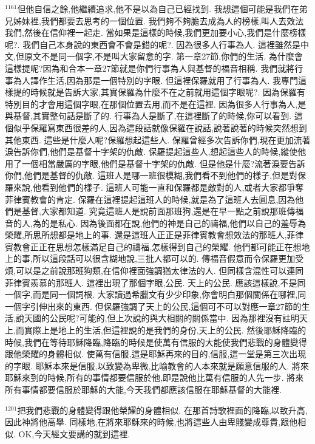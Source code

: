 \documentclass{book}
\begin{document}
$^{1161}$但他自信之餘,他繼續追求,他不是以為自己已經找到.
我想這個可能是我們在弟兄姊妹裡,我們都要去思考的一個位置.
我們夠不夠膽去成為人的榜樣,叫人去效法我們,然後在信仰裡一起走.
當如果是這樣的時候,我們更加要小心,我們是什麼榜樣呢?.
我們自己本身說的東西會不會是錯的呢?.
因為很多人行事為人.
這裡雖然是中文,但原文不是同一個字,不是叫大家留意的字.
第一章27節,你們的生活.
為什麼會這樣提呢?因為和合本一章27節就是你們行事為人與基督的福音相稱.
我們就將行事為人譯作生活,因為那是一個特別的字眼.
但這裡保羅就用了行事為人.
我專門這樣提的時候就是告訴大家,其實保羅為什麼不在之前就用這個字眼呢?.
因為保羅有特別目的才會用這個字眼,在那個位置去用,而不是在這裡.
因為很多人行事為人,是與基督,其實整句話是斷了的.
行事為人是斷了,在這裡斷了的時候,你可以看到.
這個似乎保羅寫東西很差的人,因為這段話就像保羅在說話,說著說著的時候突然想到其他東西.
這些是什麼人呢?保羅想起這些人.
保羅曾經多次告訴你們,現在更加流著淚告訴你們,他們是基督十字架的仇敵.
保羅提起這些人,想起這些人的時候,縱使他用了一個相當嚴厲的字眼,他們是基督十字架的仇敵.
但是他是什麼?流著淚要告訴你們,他們是基督的仇敵.
這班人是哪一班很模糊,我們看不到他們的樣子,但是對保羅來說,他看到他們的樣子.
這班人可能一直和保羅都是敵對的人,或者大家都爭奪菲律賓教會的肯定.
保羅在這裡提起這班人的時候,就是為了這班人去圓息,因為他們是基督,大家都知道.
究竟這班人是說前面那班狗,還是在早一點之前說那班傳福音的人,為的是私心.
因為後面都在說,他們的神是自己的禱福,他們以自己的羞辱為榮耀,所思所想都是地上的事.
還是這班人正正是菲律賓教會想效法的那班人,菲律賓教會正正在思想怎樣滿足自己的禱福,怎樣得到自己的榮耀.
他們都可能正在想地上的事,所以這段話可以很含糊地說,三批人都可以的.
傳福音假意而令保羅更加受煩,可以是之前說那班狗類,在信仰裡面強調猶太律法的人.
但同樣含混性可以連同菲律賓羨慕的那班人.
這裡出現了那個字眼,公民.
天上的公民.
應該這樣說,不是同一個字,而是同一個詞根.
大家讀過希臘文有少少印象,你會明白那個關係在哪裡,同一個字引伸出來的東西.
但保羅強調了天上的公民,這個可不可以對應一章27節的生活,說天國的公民呢?可能的,但上次說的與大相關的關係當中.
因為那裡沒有註明天上,而實際上是地上的生活,但這裡說的是我們的身份,天上的公民.
然後耶穌降臨的時候,我們在等待耶穌降臨,降臨的時候是使萬有信服的大能使我們悲戰的身體變得跟他榮耀的身體相似.
使萬有信服,這是耶穌再來的目的,信服,這一堂是第三次出現的字眼.
耶穌本來是信服,以致變為卑微,比喻教會的人本來就是願意信服的人.
將來耶穌來到的時候,所有的事情都要信服於他,即是說他比萬有信服的人先一步.
將來所有事情都要信服於耶穌的大能,今天我們都應該信服在耶穌基督的大能裡.

$^{1201}$把我們悲戰的身體變得跟他榮耀的身體相似.
在那首詩歌裡面的降臨,以致升高,因此神將他高舉.
同樣地,在將來耶穌來的時候,也將這些人由卑賤變成尊貴,跟他相似.
OK,今天經文要講的就到這裡.
\newpage
\end{document}
